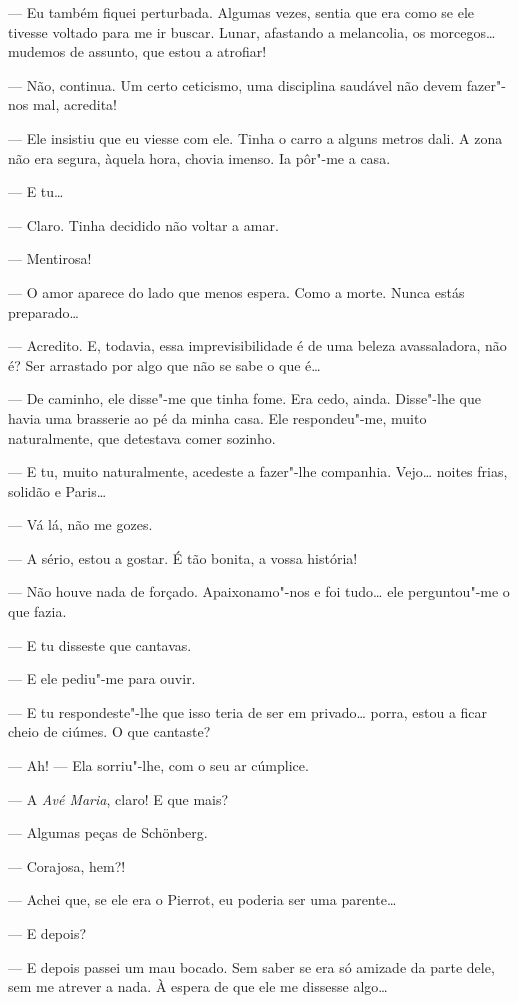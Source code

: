 --- Eu também fiquei perturbada. Algumas vezes, sentia que era como se ele
tivesse voltado para me ir buscar. Lunar, afastando a melancolia, os
morcegos\ldots{} mudemos de assunto, que estou a atrofiar!

--- Não, continua. Um certo ceticismo, uma disciplina saudável não devem
fazer"-nos mal, acredita!

--- Ele insistiu que eu viesse com ele. Tinha o carro a alguns metros
dali. A zona não era segura, àquela hora, chovia imenso. Ia pôr"-me a
casa.

--- E tu\ldots{}

--- Claro. Tinha decidido não voltar a amar.

--- Mentirosa!

--- O amor aparece do lado que menos espera. Como a morte. Nunca estás
preparado\ldots{}

--- Acredito. E, todavia, essa imprevisibilidade é de uma beleza
avassaladora, não é? Ser arrastado por algo que não se sabe o que é\ldots{}

--- De caminho, ele disse"-me que tinha fome. Era cedo, ainda. Disse"-lhe
que havia uma brasserie ao pé da minha casa. Ele respondeu"-me, muito
naturalmente, que detestava comer sozinho.

--- E tu, muito naturalmente, acedeste a fazer"-lhe companhia. Vejo\ldots{}
noites frias, solidão e Paris\ldots{}

--- Vá lá, não me gozes.

--- A sério, estou a gostar. É tão bonita, a vossa história!

--- Não houve nada de forçado. Apaixonamo"-nos e foi tudo\ldots{} ele
perguntou"-me o que fazia.

--- E tu disseste que cantavas.

--- E ele pediu"-me para ouvir.

--- E tu respondeste"-lhe que isso teria de ser em privado\ldots{} porra, estou a
ficar cheio de ciúmes. O que cantaste?

--- Ah! --- Ela sorriu"-lhe, com o seu ar cúmplice.

--- A \emph{Avé Maria}, claro! E que mais?

--- Algumas peças de Schönberg.

--- Corajosa, hem?!

--- Achei que, se ele era o Pierrot, eu poderia ser uma parente\ldots{}

--- E depois?

--- E depois passei um mau bocado. Sem saber se era só amizade da parte
dele, sem me atrever a nada. À espera de que ele me dissesse algo\ldots{}

